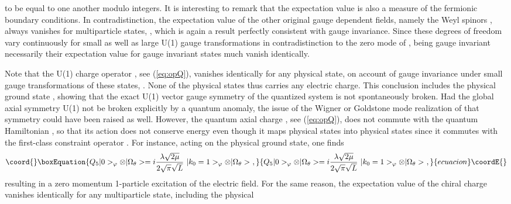 \documentclass[a4paper,11pt]{article}
\begin{document}
to be equal to one another modulo integers. It is interesting to remark that 
the expectation value \coordHE{} is also a measure of the fermionic boundary 
conditions. In contradistinction, the expectation value of the other original 
gauge dependent fields, namely the Weyl spinors \coordHE{}, always vanishes
for multiparticle states, \coordHE{}, which is again a result
perfectly consistent with gauge invariance. Since these degrees of 
freedom vary continuously for small as well as large U(1) gauge 
transformations in contradistinction to the zero mode of \coordHE{}, being
gauge invariant necessarily their expectation value for gauge invariant 
states much vanish identically.

Note that the U(1) charge operator \coordHE{}, see (\ref{eq:opQ}), 
vanishes identically for any physical state, on account of gauge invariance
under small gauge transformations of these states,
\coordHE{}. None of the physical states
thus carries any electric charge. This conclusion includes the
physical ground state \coordHE{}, showing
that the exact U(1) vector gauge symmetry of the quantized system
is not spontaneously broken. Had the global axial symmetry U(1)\coordHE{}
not be broken explicitly by a quantum anomaly, the issue of the Wigner or 
Goldstone mode realization of that symmetry could have been raised as well. 
However, the quantum axial charge \coordHE{}, see (\ref{eq:opQ}), does not commute
with the quantum Hamiltonian \coordHE{}, so that its action does not conserve
energy even though it maps physical states into physical states since
it commutes with the first-class constraint operator \coordHE{}. For
instance, acting on the physical ground state, one finds
\begin{equation}\coord{}\boxEquation{
Q_5|0>_\varphi\otimes|\Omega_\theta>=
i\frac{\lambda\sqrt{2\mu}}{2\sqrt{\pi}\sqrt{L}}\ 
|k_0=1>_\varphi\otimes|\Omega_\theta>\ ,
}{
Q_5|0>_\varphi\otimes|\Omega_\theta>=
i\frac{\lambda\sqrt{2\mu}}{2\sqrt{\pi}\sqrt{L}}\ 
|k_0=1>_\varphi\otimes|\Omega_\theta>\ ,
}{ecuacion}\coordE{}\end{equation}
resulting in a zero momentum 1-particle excitation of the electric field. 
For the same reason, the expectation value of the chiral charge vanishes 
identically for any multiparticle state, including the physical 
\end{document}
